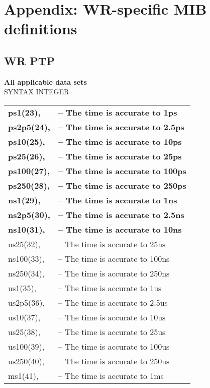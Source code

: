 \chapter{Appendix: WR-specific MIB definitions} 
\label{appG}

\section{WR PTP}
\vspace{5 mm}
\textbf{All applicable data sets} \\
\vspace{5 mm}
SYNTAX INTEGER {
\begin{table}[!ht]
\scriptsize 
\begin{tabular}{ l l }
\textbf{ps1(23),}   & \textbf{-- The time is accurate to 1ps} \\
\textbf{ps2p5(24),} & \textbf{-- The time is accurate to 2.5ps} \\
\textbf{ps10(25),}  & \textbf{-- The time is accurate to 10ps} \\
\textbf{ps25(26),}  & \textbf{-- The time is accurate to 25ps} \\
\textbf{ps100(27),} & \textbf{-- The time is accurate to 100ps} \\
\textbf{ps250(28),} & \textbf{-- The time is accurate to 250ps} \\
\textbf{ns1(29),}   & \textbf{-- The time is accurate to 1ns} \\
\textbf{ns2p5(30),} & \textbf{-- The time is accurate to 2.5ns} \\
\textbf{ns10(31),}  & \textbf{-- The time is accurate to 10ns} \\
ns25(32),   & -- The time is accurate to 25ns \\
ns100(33),  & -- The time is accurate to 100ns \\
ns250(34),  & -- The time is accurate to 250ns \\
us1(35),    & -- The time is accurate to 1us \\
us2p5(36),  & -- The time is accurate to 2.5us \\
us10(37),   & -- The time is accurate to 10us \\
us25(38),   & -- The time is accurate to 25us \\
us100(39),  & -- The time is accurate to 100us \\
us250(40),  & -- The time is accurate to 250us \\
ms1(41),    & -- The time is accurate to 1ms \\

\end{tabular}
\end{table}}
